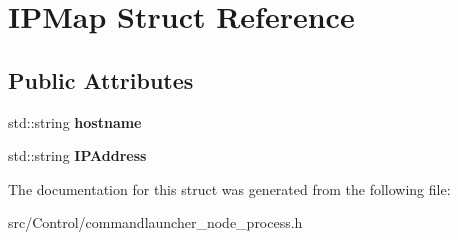 \hypertarget{structIPMap}{}\section{I\+P\+Map Struct Reference}
\label{structIPMap}
\subsection*{Public Attributes}
\begin{DoxyCompactItemize}
\item 
\mbox{\label{structIPMap_a20e07ae2927d7563c99db06ef68428db}} 
std\+::string {\bfseries hostname}
\item 
\mbox{\label{structIPMap_aa04f02f0433819879419a1510cc9e51b}} 
std\+::string {\bfseries I\+P\+Address}
\end{DoxyCompactItemize}


The documentation for this struct was generated from the following file\+:\begin{DoxyCompactItemize}
\item 
src/\+Control/commandlauncher\+\_\+node\+\_\+process.\+h\end{DoxyCompactItemize}
